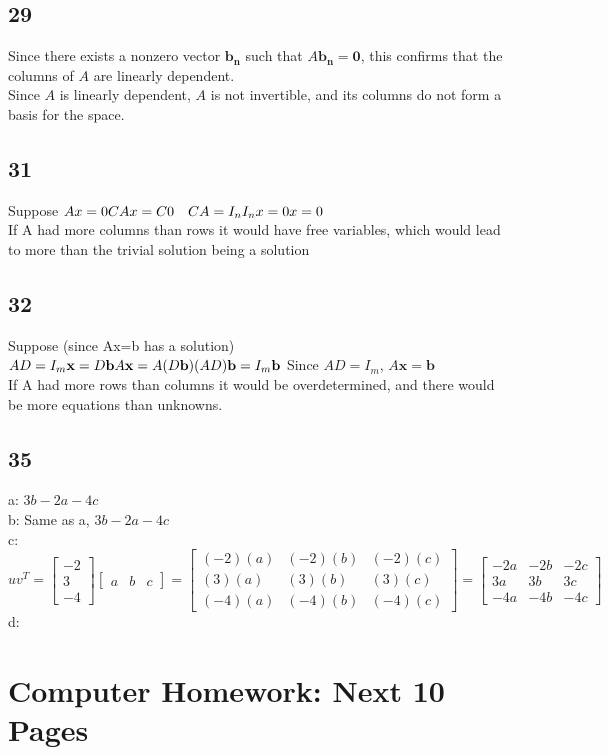 \documentclass{article}
\begin{document}
\subsection*{29}
Since there exists a nonzero vector $ \mathbf{b_n}$  such that  $A \mathbf{b_n} = \mathbf{0}$, this confirms that the columns of  $A$  are linearly dependent.
\\Since $A$ is linearly dependent,  $A$  is not invertible, and its columns do not form a basis for the space.
\subsection*{31}
Suppose $Ax=0 \\ CAx=C0 \quad CA=I_n \\ I_nx=0 \\ x=0$
\\If A had more columns than rows it would have free variables, which would lead to more than the trivial solution being a solution
\subsection*{32}
Suppose (since Ax=b has a solution) $
AD = I_m\\
\mathbf{x} = D \mathbf{b}
\\A \mathbf{x} = A (D \mathbf{b})
\\(AD) \mathbf{b} = I_m \mathbf{b}$ Since $AD = I_m$, $A \mathbf{x} = \mathbf{b}$
\\If A had more rows than columns it would be overdetermined, and there would be more equations than unknowns. 
\subsection*{35}
a: $3b-2a-4c$
\\b: Same as a, $3b-2a-4c$
\\c: $u v^T = \begin{bmatrix} -2 \\ 3 \\ -4 \end{bmatrix}\begin{bmatrix} a & b & c \end{bmatrix} = 
\begin{bmatrix}
(-2)(a) & (-2)(b) & (-2)(c) \\
(3)(a) & (3)(b) & (3)(c) \\
(-4)(a) & (-4)(b) & (-4)(c)
\end{bmatrix} = 
\begin{bmatrix}
-2a & -2b & -2c \\
3a & 3b & 3c \\
-4a & -4b & -4c
\end{bmatrix}
$
\\d: 
\pagebreak \section*{Computer Homework: Next 10 Pages}
\end{document}

